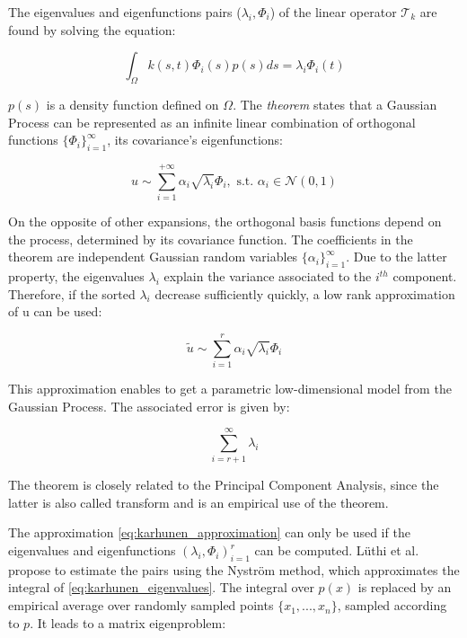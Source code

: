 The eigenvalues and eigenfunctions pairs ($\lambda_i, \Phi_i$) of the linear operator $\mathcal{T}_k$ are found by solving the equation: 

\begin{equation}
	\label{eq:karhunen_eigenvalues}
	\int_\Omega k(s,t)\Phi_i(s) p(s) ds = \lambda_i \Phi_i(t)
\end{equation}

$p(s)$ is a density function defined on $\Omega$.
The \textit{\kl* theorem} states that a Gaussian Process can be represented as an infinite linear combination of orthogonal functions $\{\Phi_i\}_{i=1}^\infty$, its covariance's eigenfunctions:

\begin{equation}
	\label{eq:karhunen_th}
	u \sim \sum_{i=1}^{+\infty} \alpha_i \sqrt{\lambda_i} \Phi_i, \text{ \ \ \  s.t. } \alpha_i \in \mathcal{N}(0,1)
\end{equation}


On the opposite of other expansions, the orthogonal basis functions depend on the process, determined by its covariance function. The coefficients in the \kl* theorem are independent Gaussian random variables $\{\alpha_i\}_{i=1}^\infty$. Due to the latter property, the eigenvalues $\lambda_i$ explain the variance associated to the $i^{th}$ component. Therefore, if the sorted $\lambda_i$ decrease sufficiently quickly, a low rank approximation of u can be used: 

\begin{equation}
	\label{eq:karhunen_approximation}
	\tilde{u} \sim \sum_{i=1}^{r} \alpha_i \sqrt{\lambda_i} \Phi_i
\end{equation}

This approximation enables to get a parametric low-dimensional model from the Gaussian Process. The associated error is given by: 

\begin{equation}
	\sum_{i=r+1}^{\infty} \lambda_i
\end{equation}

 
The \kl* theorem is closely related to the Principal Component Analysis, since the latter is also called \kl* transform and is an empirical use of the \kl* theorem. 

The approximation \eqref{eq:karhunen_approximation} can only be used if the eigenvalues and eigenfunctions $(\lambda_i, \Phi_i)_{i=1}^r$ can be computed. Lüthi et al. propose to estimate the pairs using the Nyström method, which approximates the integral of \eqref{eq:karhunen_eigenvalues}. 
The integral over $p(x)$ is replaced by an empirical average over randomly sampled points $\{x_1,...,x_n\}$, sampled according to $p$. It leads to a matrix eigenproblem: 

